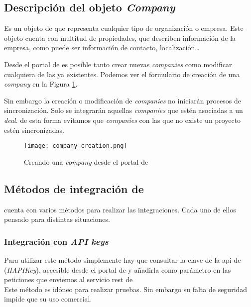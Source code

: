 \subsection{Descripción del objeto \textit{Company}}
		
		Es un objeto de \hs{} que representa cualquier tipo de organización o empresa. 
		Este objeto cuenta con multitud de propiedades, que describen información de la empresa, como puede ser información de contacto, localización\ldots 
		
		Desde el portal de \hs{} es posible tanto crear nuevas \textit{companies} como modificar cualquiera de las ya existentes. Podemos ver el formulario de creación de una \textit{company} en la Figura \ref{fig:company_creation}.
		
		Sin embargo la creación o modificación de \textit{companies} no iniciarán procesos de sincronización. Solo se integrarán aquellas \textit{companies} que estén asociadas a un \textit{deal}.
		de esta forma evitamos que \textit{companies} con las que no existe un proyecto estén sincronizadas.
		
		\begin{figure}
			\centering
			\texttt{[image: company\_creation.png]}
			\caption{Creando una \textit{company} desde el portal de \hs{}}
			\label{fig:company_creation}
		\end{figure}


\subsection{Métodos de integración de \hs{}}
\hs{} cuenta con varios métodos para realizar las integraciones. Cada uno de ellos pensado para distintas situaciones.

\subsubsection{Integración con \textit{API keys}}

Para utilizar este método simplemente hay que consultar la clave de la \acrshort{api} de \hs{} (\textit{HAPIKey}), 
accesible desde el portal de \hs{} y añadirla como parámetro en las peticiones que enviemos al servicio \acrshort{rest} de \hs{}\\

Este método es idóneo para realizar pruebas. Sin embargo su falta de seguridad impide que su uso comercial. %

